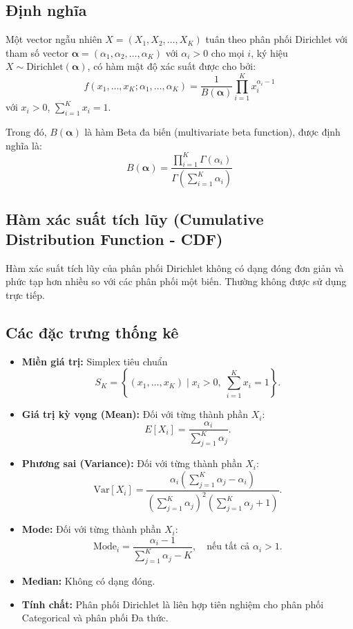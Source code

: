 	\subsection{Định nghĩa}
		Một vector ngẫu nhiên $X = (X_1, X_2, \dots, X_K)$ tuân theo phân phối Dirichlet với tham số vector $\boldsymbol{\alpha} = (\alpha_1, \alpha_2, \dots, \alpha_K)$ với $\alpha_i > 0$ cho mọi $i$, ký hiệu $X \sim \text{Dirichlet}(\boldsymbol{\alpha})$, có hàm mật độ xác suất được cho bởi:
		\[ f(x_1, \dots, x_K; \alpha_1, \dots, \alpha_K) = \frac{1}{B(\boldsymbol{\alpha})} \prod_{i=1}^K x_i^{\alpha_i-1} \]
		với $x_i > 0$, $\sum_{i=1}^K x_i = 1$.
		
		Trong đó, $B(\boldsymbol{\alpha})$ là hàm Beta đa biến (multivariate beta function), được định nghĩa là:
		\[ B(\boldsymbol{\alpha}) = \frac{\prod_{i=1}^K \Gamma(\alpha_i)}{\Gamma\left(\sum_{i=1}^K \alpha_i\right)} \]
	
	\subsection{Hàm xác suất tích lũy (Cumulative Distribution Function - CDF)}
	Hàm xác suất tích lũy của phân phối Dirichlet không có dạng đóng đơn giản và phức tạp hơn nhiều so với các phân phối một biến. Thường không được sử dụng trực tiếp.
	
	\subsection{Các đặc trưng thống kê}
	\begin{itemize}
		\item \textbf{Miền giá trị:} Simplex tiêu chuẩn 
		\[
		S_K = \left\{ (x_1, \dots, x_K) \mid x_i > 0,\; \sum_{i=1}^K x_i = 1 \right\}.
		\]

		\item \textbf{Giá trị kỳ vọng (Mean):} Đối với từng thành phần $X_i$:
		\[
		E[X_i] = \frac{\alpha_i}{\sum_{j=1}^K \alpha_j}.
		\]

		\item \textbf{Phương sai (Variance):} Đối với từng thành phần $X_i$:
		\[
		\mathrm{Var}[X_i] = 
		\frac{\alpha_i \left( \sum_{j=1}^K \alpha_j - \alpha_i \right)}
			{\left( \sum_{j=1}^K \alpha_j \right)^2 \left( \sum_{j=1}^K \alpha_j + 1 \right)}.
		\]

		\item \textbf{Mode:} Đối với từng thành phần $X_i$:
		\[
		\mathrm{Mode}_i = \frac{\alpha_i - 1}{\sum_{j=1}^K \alpha_j - K},
		\quad \text{nếu tất cả } \alpha_i > 1.
		\]

		\item \textbf{Median:} Không có dạng đóng.

		\item \textbf{Tính chất:} Phân phối Dirichlet là liên hợp tiên nghiệm cho phân phối Categorical và phân phối Đa thức.
	\end{itemize}

